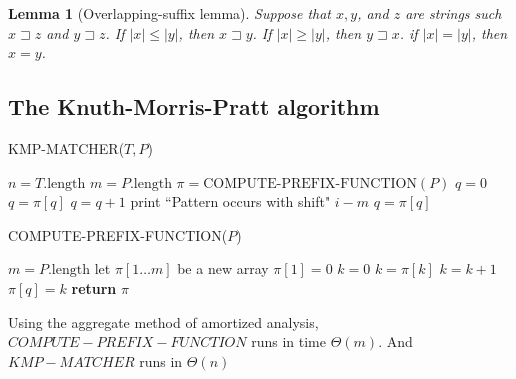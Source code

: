 \documentclass[12pt]{article}
\newtheorem{lemma}[theorem]{Lemma}
\begin{document}
\begin{lemma} [Overlapping-suffix lemma]
  Suppose that $x, y$, and $z$ are strings such $x \sqsupset z$ and $y \sqsupset z$. If $|x| \le |y|$, then $x \sqsupset y$. If $|x| \ge |y|$, then $y \sqsupset x$. if $|x| = |y|$, then $x = y$.
\end{lemma}

\subsection{The Knuth-Morris-Pratt algorithm}

KMP-MATCHER($T, P$)
\begin{algorithmic} [1]
\State $n = T.\text{length}$
\State $m = P.\text{length}$
\State $\pi = \text{COMPUTE-PREFIX-FUNCTION}(P)$
\State $q = 0$
        	\State $q = \pi [q]$
        \EndWhile
		\State $q = q + 1$
        \EndIf
		\State print ``Pattern occurs with shift" $i-m$
                \State $q = \pi [q]$
        \EndIf
\EndFor
\end{algorithmic}

COMPUTE-PREFIX-FUNCTION($P$)
\begin{algorithmic} [1]
\State $m = P.\text{length}$
\State let $\pi [1 \dots m]$ be a new array
\State $\pi [1] = 0$
\State $k = 0$
		\State $k = \pi [k]$
        \EndWhile
        	\State $k = k + 1$
        \EndIf
        \State $\pi [q] = k$
\EndFor
\State \textbf{return } $\pi$
\end{algorithmic}

Using the aggregate method of amortized analysis, $COMPUTE-PREFIX-FUNCTION$ runs in time $\Theta(m)$. And $KMP-MATCHER$ runs in $\Theta(n)$
\end{document}

